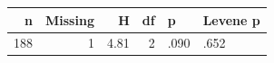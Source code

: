 \begingroup\footnotesize
\begin{tabular}{rrrrll}
  \toprule
n & Missing & H & df & p & Levene p \\ 
  \midrule
188 &   1 & 4.81 &   2 & .090 & .652 \\ 
   \bottomrule
\end{tabular}
\endgroup
